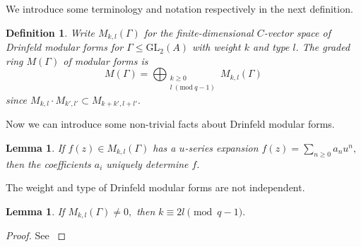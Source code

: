\documentclass[11pt]{amsart}
\newtheorem{lemma}[theorem]{Lemma}
\newtheorem{definition}[theorem]{Definition}
\theoremstyle{definition}
\newenvironment{psmallmatrix}
{\left(\begin{smallmatrix}}
	{\end{smallmatrix}\right)}
\numberwithin{equation}{section}
\newcommand{\GL}{\mathrm{GL}} 	%
\newcommand{\bbF}{\mathbb{F}}		%
\newcommand{\Mod}[1]{\ (\mathrm{mod}\ #1)}
\begin{document}
		We introduce some terminology and notation respectively in the next definition.
		
		\begin{definition}
			Write $M_{k,l}(\Gamma)$ for the finite-dimensional $C$-vector space of Drinfeld modular forms for $\Gamma\leq \GL_2(A)$ with weight $k$ and type $l.$ The graded ring $M(\Gamma)$ of modular forms is 
			\[M(\Gamma)=\bigoplus_{\substack{k\geq 0\\l\Mod{q-1}}} M_{k,l}(\Gamma)\]
			since $M_{k,l}\cdot M_{k',l'}\subset M_{k+k',l+l'}.$
		\end{definition}
		
		Now we can introduce some non-trivial facts about Drinfeld modular forms.
		
		\begin{lemma}\cite[Remark $5.8.\mathrm{iii}$]{Gekeler-Coeff}\label{l: u-series coeffs determine form}
			If $f(z)\in M_{k,l}(\Gamma)$ has a $u$-series expansion $f(z)=\sum_{n\geq 0}a_nu^n,$ then the coefficients $a_i$ uniquely determine $f.$
		\end{lemma}
		
		The weight and type of Drinfeld modular forms are not independent. 
		
		\begin{lemma}\cite[Remark $(5.8.\mathrm{i})$]{Gekeler-Coeff}\label{l: weight-type}
			If $M_{k,l}(\Gamma)\neq 0,$ then $k\equiv 2l\pmod{q-1}.$
		\end{lemma}
		\begin{proof}
			See \cite[Remark $(5.8.\mathrm{iii})$]{Gekeler-Coeff}
		\end{proof}
		
\end{document}
